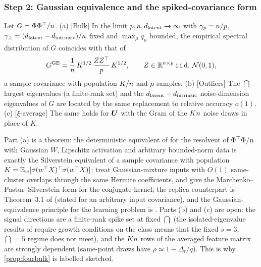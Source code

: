 \subsubsection{Step 2: Gaussian equivalence and the spiked-covariance form}

\begin{assumption}\label{ass:fourbulk-ge}
Let $G=\Phi\Phi^\top/n$. (a) [Bulk] In the limit $p,n,d_{\mathrm{latent}}\to\infty$ with $\gamma_p=n/p$, $\gamma_\perp=(d_{\mathrm{latent}}-d_{\mathrm{intrinsic}})/n$ fixed and $\max_\mu q_\mu$ bounded, the empirical spectral distribution of $G$ coincides with that of
\begin{equation}\label{eq:fourbulk-GE}
  G^{\mathrm{GE}}=\frac{1}{n}\,K^{1/2}\,\frac{ZZ^\top}{p}\,K^{1/2},\qquad Z\in\mathbb{R}^{n\times p}\ \text{i.i.d.}\ \mathcal N(0,1),
\end{equation}
a sample covariance with population $K/n$ and $p$ samples. (b) [Outliers] The $\dint$ largest eigenvalues (a finite-rank set) and the $d_{\mathrm{latent}}-d_{\mathrm{intrinsic}}$ noise-dimension eigenvalues of $G$ are located by the same replacement to relative accuracy $o(1)$. (c) [$\xi$-average] The same holds for $\bm{U}$ with the Gram of the $Kn$ noise draws in place of $K$.
\end{assumption}
Part (a) is a theorem: the deterministic equivalent of \citet{louart2018random} for the resolvent of $\Phi^\top\Phi/n$ with Gaussian $W$, Lipschitz activation and arbitrary bounded-norm data is exactly the Silverstein equivalent of a sample covariance with population $K=\mathbb{E}_w[\sigma(w^\top X)^\top\sigma(w^\top X)]$; \citet{liao2018spectrum} treat Gaussian-mixture inputs with $O(1)$ same-cluster overlaps through the same Hermite coefficients, and \citet{fanwang2020spectra} give the Marchenko--Pastur--Silverstein form for the conjugate kernel; the replica counterpart is Theorem~3.1 of \citet{bonnaire2025} (stated for an arbitrary input covariance), and the Gaussian-equivalence principle for the learning problem is \citet{goldt2022gaussian,hu2022universality,mei2022generalization}. Parts (b) and (c) are open: the signal directions are a finite-rank spike set at fixed $\dint$ (the isolated-eigenvalue results of \citet{liao2018spectrum} require growth conditions on the class means that the fixed $s=3$, $\dint=5$ regime does not meet), and the $Kn$ rows of the averaged feature matrix are strongly dependent (same-point draws have $\rho\simeq1-\Delta_t/q$). This is why \cref{prop:fourbulk} is labelled sketched.

